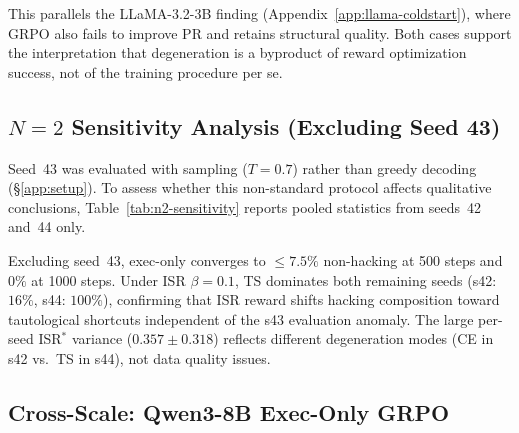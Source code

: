 This parallels the LLaMA-3.2-3B finding (Appendix~\ref{app:llama-coldstart}), where GRPO also fails to improve PR and retains structural quality.
Both cases support the interpretation that degeneration is a byproduct of reward optimization success, not of the training procedure per se.

\subsection{$N{=}2$ Sensitivity Analysis (Excluding Seed 43)}
\label{app:n2-sensitivity}

Seed~43 was evaluated with sampling ($T{=}0.7$) rather than greedy decoding (\S\ref{app:setup}).
To assess whether this non-standard protocol affects qualitative conclusions, Table~\ref{tab:n2-sensitivity} reports pooled statistics from seeds~42 and~44 only.

\begin{table}[h]
\centering
{}
\caption{Pooled statistics excluding seed~43 ($N{=}2$, seeds~42 and~44 only). Mean$\pm$std of per-seed values. Qualitative patterns preserved: exec-only converges to ${\leq}7.5\%$ non-hacking; ISR $\beta{=}0.1$ shifts composition toward TS.}
\label{tab:n2-sensitivity}
\end{table}

Excluding seed~43, exec-only converges to ${\leq}7.5\%$ non-hacking at 500 steps and $0\%$ at 1000 steps.
Under ISR $\beta{=}0.1$, TS dominates both remaining seeds (s42: $16\%$, s44: $100\%$), confirming that ISR reward shifts hacking composition toward tautological shortcuts independent of the s43 evaluation anomaly.
The large per-seed ISR$^*$ variance ($0.357 \pm 0.318$) reflects different degeneration modes (CE in s42 vs.\ TS in s44), not data quality issues.

\subsection{Cross-Scale: Qwen3-8B Exec-Only GRPO}
\label{app:8b-results}

